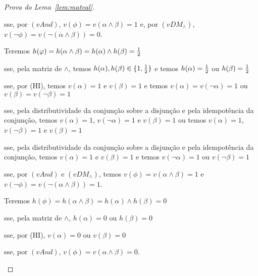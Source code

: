 \begin{proof}[Prova do Lema~\ref{lem:matval}]
\begin{provaporcasos}
\begin{provaporsubcasos}
                    \qquad{}sse, por $(vAnd)$, $v(\phi) = v(\alpha \land \beta) = 1$ e, por $(vDM_{\land})$, $v(\neg \phi) = v(\neg(\alpha \land \beta)) = 0$.
            

                    Teremos $h(\varphi) = h(\alpha \land \beta) = h(\alpha) \land h(\beta) = \frac{1}{2}{}$

                    \qquad{}sse, pela matriz de $\land$, temos $h(\alpha), h(\beta) \in \{1, \frac{1}{2}{}\}$ e temos $h(\alpha) = \frac{1}{2}{}$ ou $h(\beta) = \frac{1}{2}{}$
                    
                    \qquad{}sse, por (HI), temos $v(\alpha) = 1$ e $v(\beta) = 1$ e temos $v(\alpha) = v(\neg \alpha) = 1$ ou $v(\beta) = v(\neg \beta) = 1$

                    \qquad{}sse, pela distributividade da conjunção sobre a disjunção e pela idempotência da conjunção, temos $v(\alpha) = 1$, $v(\neg \alpha) = 1$ e $v(\beta) = 1$ ou temos $v(\alpha) = 1$, $v(\neg \beta) = 1$ e $v(\beta) = 1$

                    \qquad{}sse, pela distributividade da conjunção sobre a disjunção e pela idempotência da conjunção, temos $v(\alpha) = 1$ e $v(\beta) = 1$ e temos $v(\neg \alpha) = 1$ ou $v(\neg \beta) = 1$

                    \qquad{}sse, por $(vAnd)$ e $(vDM_{\land})$, temos $v(\phi) = v(\alpha \land \beta) = 1$ e $v(\neg \phi) = v(\neg (\alpha \land \beta)) = 1$.


                    Teremos $h(\phi) = h(\alpha \land \beta) = h(\alpha) \land h(\beta) = 0$

                    \qquad{}sse, pela matriz de $\land$, $h(\alpha) = 0$ ou $h(\beta) = 0$

                    \qquad{}sse, por (HI), $v(\alpha) = 0$ ou $v(\beta) = 0$

                    \qquad{}sse, por $(vAnd)$, $v(\phi) = v(\alpha \land \beta) = 0$.

            \end{provaporsubcasos}



\end{provaporcasos}
\end{proof}
